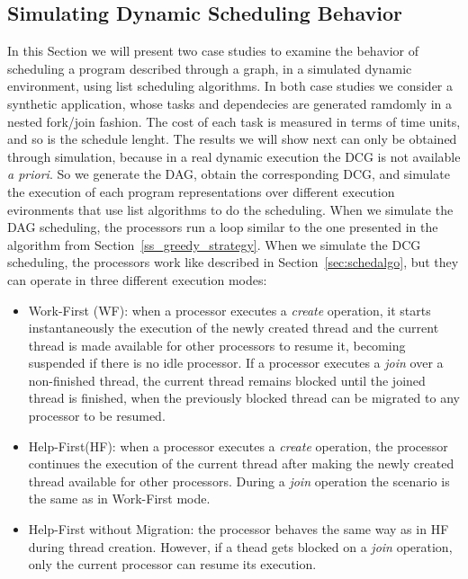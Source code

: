 \documentclass[twocolumn]{svjour3}
\begin{document}
\subsection{Simulating Dynamic Scheduling Behavior}

{\color{blue}

In this Section we will present two case studies to examine the behavior of scheduling a program described through a graph, in a simulated dynamic environment, using list scheduling algorithms. In both case studies we consider a synthetic application, whose tasks and dependecies are generated ramdomly in a nested fork/join fashion. The cost of each task is measured in terms of time units, and so is the schedule lenght. The results we will show next can only be obtained through simulation, because in a real dynamic execution the DCG is not available \emph{a priori}. So we generate the DAG, obtain the corresponding DCG, and simulate the execution of each program representations over different execution evironments that use list algorithms to do the scheduling. When we simulate the DAG scheduling, the processors run a loop similar to the one presented in the algorithm from Section~\ref{ss_greedy_strategy}. When we simulate the DCG scheduling, the processors work like described in Section~\ref{sec:schedalgo}, but they can operate in three different execution modes:

}

\begin{itemize}
\item Work-First (WF): when a processor executes a \emph{create} operation, it starts instantaneously the execution of the newly created thread and the current thread is made available for other processors to resume it, becoming suspended if there is no idle processor. If a processor executes a \emph{join} over a non-finished thread, the current thread remains blocked until the joined thread is finished, when the previously blocked thread can be migrated to any processor to be resumed.
\item Help-First(HF): when a processor executes a \emph{create} operation, the processor continues the execution of the current thread after making the newly created thread available for other processors. During a \emph{join} operation the scenario is the same as in Work-First mode.
\item Help-First without Migration: the processor behaves the same way as in HF during thread creation. However, if a thead gets blocked on a \emph{join} operation, only the current processor can resume its execution.
\end{itemize}
\end{document}
